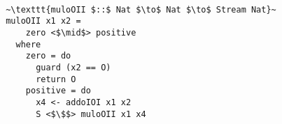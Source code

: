 \begin{figure}[!t]
  \centering
  \begin{minipage}{\columnwidth}
    \begin{lstlisting}[]

 ~\texttt{muloOII $::$ Nat $\to$ Nat $\to$ Stream Nat}~
 muloOII x1 x2 =
     zero <$\mid$> positive
   where
     zero = do
       guard (x2 == O)
       return O
     positive = do
       x4 <- addoIOI x1 x2
       S <$\$$> muloOII x1 x4
    \end{lstlisting}
  \end{minipage}
\end{figure}

